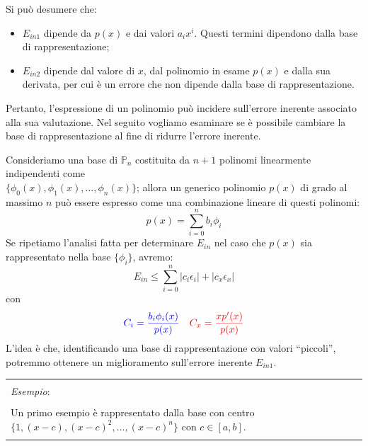 \documentclass{article}
\numberwithin{equation}{section}
\newenvironment{example}
{\begin{center}
        \begin{tabular}{|p{0.9\textwidth}|}
            \hline \\ 
            \textit{Esempio}: \\\\ 
        }
        {
            \\\\ \hline
        \end{tabular}
    \end{center}
}
\begin{document}
Si può desumere che:
\begin{itemize}
    \item $E_{in1}$ dipende da $p(x)$ e dai valori $a_ix^i$. Questi termini dipendono
   dalla base di rappresentazione;
   \item $E_{in2}$ dipende dal valore di $x$, dal polinomio in esame $p(x)$ e
       dalla sua derivata, per cui è un errore che non dipende dalla
       base di rappresentazione.
\end{itemize}
Pertanto, l'espressione di un polinomio può incidere sull'errore inerente
associato alla sua valutazione. Nel seguito vogliamo esaminare se è possibile
cambiare la base di rappresentazione al fine di ridurre l'errore inerente.

Consideriamo una base di $\mathbb{P}_n$ costituita da $n+1$ polinomi
linearmente indipendenti come \\$\{\phi_0(x),\phi_1(x),\ldots,\phi_n(x)\}$; allora
un generico polinomio $p(x)$ di grado al massimo $n$ 
può essere espresso come una combinazione lineare di questi polinomi:
$$p(x)=\displaystyle\sum_{i=0}^{n}b_i\phi_i$$
Se ripetiamo l'analisi fatta per determinare $E_{in}$ nel caso che $p(x)$ sia
rappresentato nella base $\{\phi_i\}$, avremo: 
$$E_{in}\leq \displaystyle\sum_{i=0}^{n}\left\lvert
c_i\epsilon_i\right\rvert+\left\lvert c_x\epsilon_x\right\rvert$$
con 
\begin{equation*}
   \begin{aligned}
       & {\color{blue}C_i=\frac{b_i\phi_i(x)}{p(x)}} &
       {\color{red}C_x=\frac{xp'(x)}{p(x)}}
   \end{aligned} 
\end{equation*}
L'idea è che, identificando una base di rappresentazione con valori
``piccoli'', potremmo ottenere un miglioramento sull'errore inerente $E_{in1}$.
\begin{example}
    Un primo esempio è rappresentato dalla base con centro
    $\{1,(x-c),(x-c)^2,\ldots,(x-c)^n\}$ con $c\in[a,b]$.
\end{example}
\end{document}
